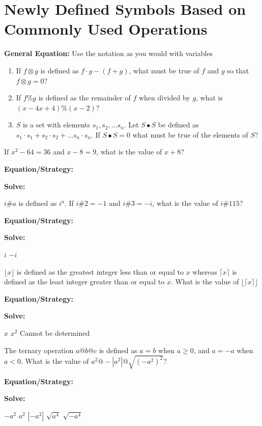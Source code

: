 \section[New Symbols]{Newly Defined Symbols Based on Commonly Used Operations}
\bigskip
\textbf{General Equation:} Use the notation as you would with variables

\vfill
\begin{enumerate}[labelindent=*,style=multiline,leftmargin=*,label=\textbf{Example \arabic*:}]
\item If $f\otimes g$ is defined as $f\cdot g-(f+g)$, what must be true of $f$ and $g$ so that $f\otimes g=0$?

\vfill\item If $f\%g$ is defined as the remainder of $f$ when divided by $g$, what is $(x-4x+4)\%(x-2)$?

\vfill\item $S$ is a set with elements $s_1, s_2,\ldots s_n$. Let $S\bullet S$ be defined as $s_1\cdot s_1+s_2\cdot s_2+\ldots s_n\cdot s_n$. If $S\bullet S=0$ what must be true of the elements of $S$?
\end{enumerate}

\vfill
\newpage
\begin{multicols*}{2}
\begin{outline}[enumerate]
\medium

\1 If $x^2-64=36$ and $x-8=9$, what is the value of $x+8$?

\bigskip
\textbf{Equation/Strategy:} \hrulefill

\bigskip
\textbf{Solve:}

\vfill
{}

\midline

\1 $i\#a$ is defined as $i^a$. If $i\#2=-1$ and $i\#3=-i$, what is the value of $i\#115$?

\bigskip
\textbf{Equation/Strategy:} \hrulefill

\bigskip
\textbf{Solve:}

\vfill
{}
\2 $i$
\2 $-i$

\columnbreak
\advanced

\1 $\lfloor x\rfloor$ is defined as the greatest integer less than or equal to $x$ whereas $\lceil x\rceil$ is defined as the least integer greater than or equal to $x$. What is the value of $\lfloor\lceil x\rceil\rfloor$

\bigskip
\textbf{Equation/Strategy:} \hrulefill

\bigskip
\textbf{Solve:}

\vfill
{}
\2 $x$
\2 $x^2$
\2 Cannot be determined

\midline

\1 The ternary operation $a@b@c$ is defined as $a=b$ when $a\geq0$, and $a=-a$ when $a<0$. What is the value of $a^2@-\left|a^2\right|@\sqrt{(-a^2)^2}$?

\bigskip
\textbf{Equation/Strategy:} \hrulefill

\bigskip
\textbf{Solve:}

\vfill
\2 $-a^2$
\2 $a^2$
\2 $\left|-a^2\right|$
\2 $\sqrt{a^4}$
\2 $\sqrt{-a^4}$
\end{outline}
\end{multicols*}